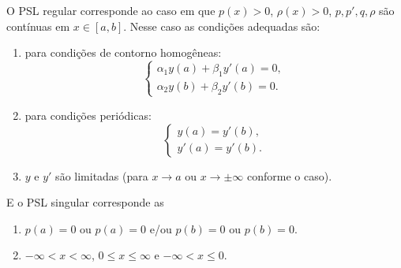 O PSL regular corresponde ao caso em que $p(x) > 0$, $\rho(x) > 0$, $p, p', q,
\rho$ são contínuas em $x \in [a,b]$. Nesse caso as condições adequadas são:
\begin{enumerate}
  \item para condições de contorno homogêneas:
    \begin{dmath*}
      \begin{cases}
        \alpha_1 y(a) + \beta_1 y'(a) = 0, \\
        \alpha_2 y(b) + \beta_2 y'(b) = 0.
      \end{cases}
    \end{dmath*}
  \item para condições periódicas:
    \begin{dmath*}
      \begin{cases}
        y(a) = y'(b), \\
        y'(a) = y'(b).
      \end{cases}
    \end{dmath*}
  \item $y$ e $y'$ são limitadas (para $x \to a$ ou $x \to \pm \infty$ conforme
    o caso).
\end{enumerate}

E o PSL singular corresponde as
\begin{enumerate}
  \item $p(a) = 0$ ou $p(a) = 0$ e/ou $p(b) = 0$ ou $p(b) = 0$.
  \item $-\infty < x < \infty$, $0 \leq x \leq \infty$ e $-\infty < x \leq 0$.
\end{enumerate}

